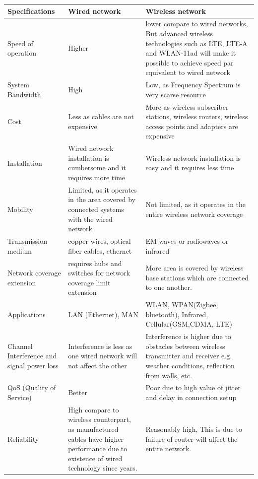 \begin{table}[ht]
\begin{center}
{\begin{tabular}{p{}p{}p{}}
\hline
Specifications       & Wired network    & Wireless network       \\ \hline
Speed of operation   & Higher           & lower compare to wired networks, But advanced wireless technologies such as LTE, LTE-A and WLAN-11ad will make it possible to achieve speed par equivalent to wired network \\
System Bandwidth     & High              & Low, as Frequency Spectrum is very scarse resource    \\
Cost                 & Less as cables are not expensive      & More as wireless subscriber stations, wireless routers, wireless access points and adapters are expensive                 \\
Installation         & Wired network installation is cumbersome and it requires more time   & Wireless network installation is easy and it requires less time             \\
Mobility            & Limited, as it operates in the area covered by connected systems with the wired network                & Not limited, as it operates in the entire wireless network coverage         \\
Transmission medium     & copper wires, optical fiber cables, ethernet   & EM waves or radiowaves or infrared  \\
Network coverage extension    & requires hubs and switches for network coverage limit extension  & More area is covered by wireless base stations which are connected to one another.    \\
Applications           & LAN (Ethernet), MAN        & WLAN, WPAN(Zigbee, bluetooth), Infrared, Cellular(GSM,CDMA, LTE) \\
Channel Interference and signal power loss & Interference is less as one wired network will not affect the other                          & Interference is higher due to obstacles between wireless transmitter and receiver e.g. weather conditions, reflection from walls, etc.                                      \\
QoS (Quality of Service)                   & Better           & Poor due to high value of jitter and delay in connection setup  \\
Reliability           & High compare to wireless counterpart, as manufactured cables have higher performance due to existence of wired technology since years. & Reasonably high, This is due to failure of router will affect the entire network.  \\ \hline
\end{tabular}
}
    \end{center}
\label{tab2}
\end{table}

